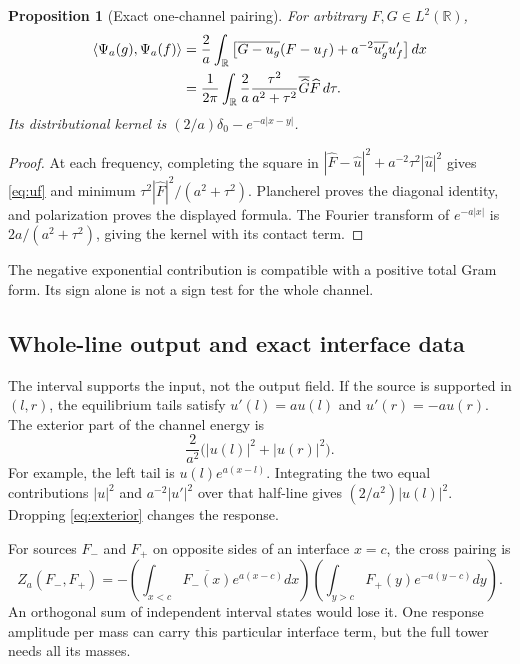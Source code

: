 \documentclass[11pt]{article}
\numberwithin{equation}{section}
\newtheorem{proposition}[theorem]{Proposition}
\theoremstyle{definition}
\theoremstyle{remark}
\newcommand{\R}{\mathbb R}
\newcommand{\ip}[2]{\left\langle#1,#2\right\rangle}
\begin{document}
\begin{proposition}[Exact one-channel pairing]
For arbitrary $F,G\in L^2(\R)$,
\begin{align}
 \ip{\Psi_a(g)}{\Psi_a(f)}
 &=\frac2a\int_\R\left[\overline{G-u_g}(F-u_f)
             +a^{-2}\overline{u_g'}u_f'\right]dx\notag\\
 &=\frac1{2\pi}\int_\R\frac2a\frac{\tau^2}{a^2+\tau^2}
       \overline{\widehat G}\widehat F\,d\tau.
 \label{eq:paira}
\end{align}
Its distributional kernel is $(2/a)\delta_0-e^{-a|x-y|}$.
\end{proposition}
\begin{proof}
At each frequency, completing the square in
$|\widehat F-\widehat u|^2+a^{-2}\tau^2|\widehat u|^2$
gives \eqref{eq:uf} and minimum $\tau^2|\widehat F|^2/(a^2+\tau^2)$. Plancherel proves the diagonal identity, and polarization proves the displayed formula. The Fourier transform of $e^{-a|x|}$ is $2a/(a^2+\tau^2)$, giving the kernel with its contact term.
\end{proof}
The negative exponential contribution is compatible with a positive total Gram form. Its sign alone is not a sign test for the whole channel.

\subsection{Whole-line output and exact interface data}
The interval supports the input, not the output field. If the source is supported in $(l,r)$, the equilibrium tails satisfy $u'(l)=au(l)$ and $u'(r)=-au(r)$. The exterior part of the channel energy is
\begin{equation}
 \frac2{a^2}\bigl(|u(l)|^2+|u(r)|^2\bigr).
 \label{eq:exterior}
\end{equation}
For example, the left tail is $u(l)e^{a(x-l)}$. Integrating the two equal contributions $|u|^2$ and $a^{-2}|u'|^2$ over that half-line gives $(2/a^2)|u(l)|^2$. Dropping \eqref{eq:exterior} changes the response.

For sources $F_-$ and $F_+$ on opposite sides of an interface $x=c$, the cross pairing is
\begin{equation}
 Z_a(F_-,F_+)=-
 \left(\int_{x<c}\overline{F_-(x)}e^{a(x-c)}dx\right)
 \left(\int_{y>c}F_+(y)e^{-a(y-c)}dy\right).
 \label{eq:crossgamma}
\end{equation}
An orthogonal sum of independent interval states would lose it. One response amplitude per mass can carry this particular interface term, but the full tower needs all its masses.
\end{document}
